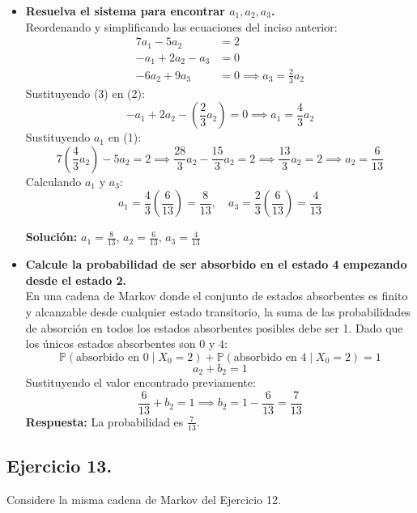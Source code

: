 \documentclass[10pt,a4paper]{book}
\begin{document}
\begin{itemize}
    \newpage
    \item[\textbf{c)}] \textbf{Resuelva el sistema para encontrar $a_1, a_2, a_3$.} \\
    Reordenando y simplificando las ecuaciones del inciso anterior:
    \begin{align}
        7a_1 - 5a_2 &= 2 \\
        -a_1 + 2a_2 - a_3 &= 0 \\
        -6a_2 + 9a_3 &= 0 \implies a_3 = \frac{2}{3}a_2 
    \end{align}
    Sustituyendo (3) en (2):
    \[ -a_1 + 2a_2 - \left(\frac{2}{3}a_2\right) = 0 \implies a_1 = \frac{4}{3}a_2 \]
    Sustituyendo $a_1$ en (1):
    \[ 7\left(\frac{4}{3}a_2\right) - 5a_2 = 2 \implies \frac{28}{3}a_2 - \frac{15}{3}a_2 = 2 \implies \frac{13}{3}a_2 = 2 \implies a_2 = \frac{6}{13} \]
    Calculando $a_1$ y $a_3$:
    \[ a_1 = \frac{4}{3}\left(\frac{6}{13}\right) = \frac{8}{13}, \quad a_3 = \frac{2}{3}\left(\frac{6}{13}\right) = \frac{4}{13} \]

\textbf{Solución:} $a_1 = \frac{8}{13}$, $a_2 = \frac{6}{13}$, $a_3 = \frac{4}{13}$

\vspace{0.5cm}

\item[\textbf{d)}] \textbf{Calcule la probabilidad de ser absorbido en el estado 4 empezando desde el estado 2.} \\
    En una cadena de Markov donde el conjunto de estados absorbentes es finito y alcanzable desde cualquier estado transitorio, la suma de las probabilidades de absorción en todos los estados absorbentes posibles debe ser 1.
    Dado que los únicos estados absorbentes son $0$ y $4$:
    \[ \mathbb{P}(\text{absorbido en } 0 \mid X_0 = 2) + \mathbb{P}(\text{absorbido en } 4 \mid X_0 = 2) = 1 \]
    \[ a_2 + b_2 = 1 \]
    Sustituyendo el valor encontrado previamente:
    \[ \frac{6}{13} + b_2 = 1 \implies b_2 = 1 - \frac{6}{13} = \frac{7}{13} \]
    \textbf{Respuesta:} La probabilidad es $\frac{7}{13}$.
\end{itemize}

\newpage

\subsection*{Ejercicio 13.} Considere la misma cadena de Markov del Ejercicio 12.

\vspace{0.2cm}
\end{document}
